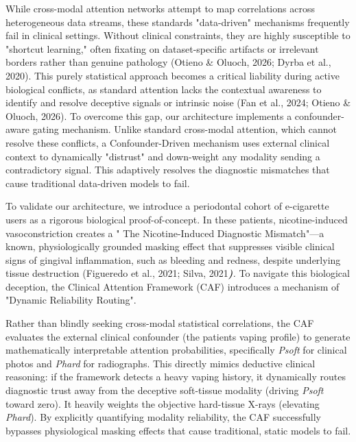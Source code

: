 \documentclass[
]{article}
\begin{document}
While cross-modal attention networks attempt to map correlations across
heterogeneous data streams, these standards "data-driven" mechanisms
frequently fail in clinical settings. Without clinical constraints, they
are highly susceptible to "shortcut learning," often fixating on
dataset-specific artifacts or irrelevant borders rather than genuine
pathology (Otieno \& Oluoch, 2026; Dyrba et al., 2020). This purely
statistical approach becomes a critical liability during active
biological conflicts, as standard attention lacks the contextual
awareness to identify and resolve deceptive signals or intrinsic noise
(Fan et al., 2024; Otieno \& Oluoch, 2026). To overcome this gap, our
architecture implements a confounder-aware gating mechanism. Unlike
standard cross-modal attention, which cannot resolve these conflicts, a
Confounder-Driven mechanism uses external clinical context to
dynamically "distrust" and down-weight any modality sending a
contradictory signal. This adaptively resolves the diagnostic mismatches
that cause traditional data-driven models to fail.

To validate our architecture, we introduce a periodontal cohort of
e-cigarette users as a rigorous biological proof-of-concept. In these
patients, nicotine-induced vasoconstriction creates a " The
Nicotine-Induced Diagnostic Mismatch"---a known, physiologically
grounded masking effect that suppresses visible clinical signs of
gingival inflammation, such as bleeding and redness, despite underlying
tissue destruction (Figueredo et al., 2021; Silva,
2021\emph{\textbf{)}.} To navigate this biological deception, the
Clinical Attention Framework (CAF) introduces a mechanism of "Dynamic
Reliability Routing".

Rather than blindly seeking cross-modal statistical correlations, the
CAF evaluates the external clinical confounder (the
patient\textquotesingle s vaping profile) to generate mathematically
interpretable attention probabilities, specifically
\emph{Psoft}\hspace{0pt} for clinical photos and
\emph{Phard}\hspace{0pt} for radiographs. This directly mimics deductive
clinical reasoning: if the framework detects a heavy vaping history, it
dynamically routes diagnostic trust away from the deceptive soft-tissue
modality (driving \emph{Psoft}\hspace{0pt} toward zero). It heavily
weights the objective hard-tissue X-rays (elevating
\emph{Phard}\hspace{0pt}). By explicitly quantifying modality
reliability, the CAF successfully bypasses physiological masking effects
that cause traditional, static models to fail.
\end{document}
